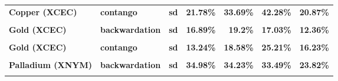 \documentclass[
  authoryear,
  preprint,
  3p]{elsarticle}
\begin{document}
\begin{longtable}[t]{>{}l>{}l>{}l>{}r>{}r>{}r>{}r}
\textbf{Copper (XCEC)} & \textbf{contango} & \textbf{sd} & \textcolor[HTML]{4285f4}{\textbf{21.78\%}} & \textcolor[HTML]{4285f4}{\textbf{33.69\%}} & \textcolor[HTML]{4285f4}{\textbf{42.28\%}} & \textcolor[HTML]{4285f4}{\textbf{20.87\%}}\\
\addlinespace
\textbf{\cellcolor{gray!10}{Gold (XCEC)}} & \textbf{\cellcolor{gray!10}{backwardation}} & \textbf{\cellcolor{gray!10}{mean}} & \textcolor[HTML]{4285f4}{\textbf{\cellcolor{gray!10}{9.19\%}}} & \textcolor[HTML]{4285f4}{\textbf{\cellcolor{gray!10}{13.37\%}}} & \textcolor[HTML]{4285f4}{\textbf{\cellcolor{gray!10}{9.37\%}}} & \textcolor[HTML]{4285f4}{\textbf{\cellcolor{gray!10}{4.21\%}}}\\
\textbf{Gold (XCEC)} & \textbf{backwardation} & \textbf{sd} & \textcolor[HTML]{4285f4}{\textbf{16.89\%}} & \textcolor[HTML]{4285f4}{\textbf{19.2\%}} & \textcolor[HTML]{4285f4}{\textbf{17.03\%}} & \textcolor[HTML]{4285f4}{\textbf{12.36\%}}\\
\textbf{\cellcolor{gray!10}{Gold (XCEC)}} & \textbf{\cellcolor{gray!10}{contango}} & \textbf{\cellcolor{gray!10}{mean}} & \textcolor[HTML]{4285f4}{\textbf{\cellcolor{gray!10}{-0.01\%}}} & \textcolor[HTML]{4285f4}{\textbf{\cellcolor{gray!10}{15.37\%}}} & \textcolor[HTML]{4285f4}{\textbf{\cellcolor{gray!10}{19.1\%}}} & \textcolor[HTML]{4285f4}{\textbf{\cellcolor{gray!10}{-3.1\%}}}\\
\textbf{Gold (XCEC)} & \textbf{contango} & \textbf{sd} & \textcolor[HTML]{4285f4}{\textbf{13.24\%}} & \textcolor[HTML]{4285f4}{\textbf{18.58\%}} & \textcolor[HTML]{4285f4}{\textbf{25.21\%}} & \textcolor[HTML]{4285f4}{\textbf{16.23\%}}\\
\textbf{\cellcolor{gray!10}{Palladium (XNYM)}} & \textbf{\cellcolor{gray!10}{backwardation}} & \textbf{\cellcolor{gray!10}{mean}} & \textcolor[HTML]{4285f4}{\textbf{\cellcolor{gray!10}{**49.79\%}}} & \textcolor[HTML]{4285f4}{\textbf{\cellcolor{gray!10}{24.47\%}}} & \textcolor[HTML]{4285f4}{\textbf{\cellcolor{gray!10}{30.01\%}}} & \textcolor[HTML]{4285f4}{\textbf{\cellcolor{gray!10}{**31.93\%}}}\\
\addlinespace
\textbf{Palladium (XNYM)} & \textbf{backwardation} & \textbf{sd} & \textcolor[HTML]{4285f4}{\textbf{34.98\%}} & \textcolor[HTML]{4285f4}{\textbf{34.23\%}} & \textcolor[HTML]{4285f4}{\textbf{33.49\%}} & \textcolor[HTML]{4285f4}{\textbf{23.82\%}}\\
\textbf{\cellcolor{gray!10}{Palladium (XNYM)}} & \textbf{\cellcolor{gray!10}{contango}} & \textbf{\cellcolor{gray!10}{mean}} & \textcolor[HTML]{4285f4}{\textbf{\cellcolor{gray!10}{-30.19\%}}} & \textcolor[HTML]{4285f4}{\textbf{\cellcolor{gray!10}{-6.3\%}}} & \textcolor[HTML]{4285f4}{\textbf{\cellcolor{gray!10}{30.58\%}}} & \textcolor[HTML]{4285f4}{\textbf{\cellcolor{gray!10}{-4.88\%}}}\\

\end{longtable}
\end{document}
